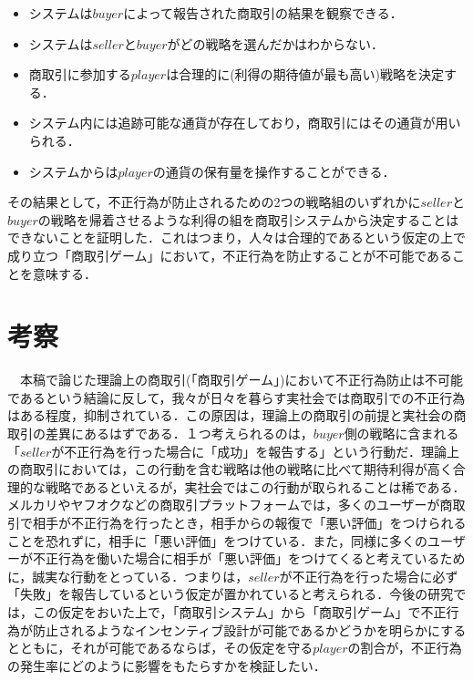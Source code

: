 \documentclass[twocolumn, a4j]{article}
\begin{document}
  \begin{itemize}
    \item システムは$buyer$によって報告された商取引の結果を観察できる．
    \item システムは$seller$と$buyer$がどの戦略を選んだかはわからない．
    \item 商取引に参加する$player$は合理的に(利得の期待値が最も高い)戦略を決定する．
    \item システム内には追跡可能な通貨が存在しており，商取引にはその通貨が用いられる．
    \item システムからは$player$の通貨の保有量を操作することができる．
  \end{itemize}

  その結果として，不正行為が防止されるための2つの戦略組のいずれかに$seller$と$buyer$の戦略を帰着させるような利得の組を商取引システムから決定することはできないことを証明した．これはつまり，人々は合理的であるという仮定の上で成り立つ「商取引ゲーム」において，不正行為を防止することが不可能であることを意味する．


\section*{考察}
　本稿で論じた理論上の商取引(「商取引ゲーム」)において不正行為防止は不可能であるという結論に反して，我々が日々を暮らす実社会では商取引での不正行為はある程度，抑制されている．この原因は，理論上の商取引の前提と実社会の商取引の差異にあるはずである．１つ考えられるのは，$buyer$側の戦略に含まれる「$seller$が不正行為を行った場合に「成功」を報告する」という行動だ．理論上の商取引においては，この行動を含む戦略は他の戦略に比べて期待利得が高く合理的な戦略であるといえるが，実社会ではこの行動が取られることは稀である．メルカリやヤフオクなどの商取引プラットフォームでは，多くのユーザーが商取引で相手が不正行為を行ったとき，相手からの報復で「悪い評価」をつけられることを恐れずに，相手に「悪い評価」をつけている．また，同様に多くのユーザーが不正行為を働いた場合に相手が「悪い評価」をつけてくると考えているために，誠実な行動をとっている．つまりは，$seller$が不正行為を行った場合に必ず「失敗」を報告しているという仮定が置かれていると考えられる．今後の研究では，この仮定をおいた上で，「商取引システム」から「商取引ゲーム」で不正行為が防止されるようなインセンティブ設計が可能であるかどうかを明らかにするとともに，それが可能であるならば，その仮定を守る$player$の割合が，不正行為の発生率にどのように影響をもたらすかを検証したい．
\end{document}
